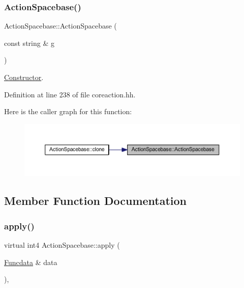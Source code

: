 \subsubsection{\texorpdfstring{ActionSpacebase()}{ActionSpacebase()}}
{\footnotesize\ttfamily Action\+Spacebase\+::\+Action\+Spacebase (\begin{DoxyParamCaption}\item[{const string \&}]{g }\end{DoxyParamCaption})\hspace{0.3cm}{\ttfamily [inline]}}



\mbox{\hyperlink{class_constructor}{Constructor}}. 



Definition at line 238 of file coreaction.\+hh.

Here is the caller graph for this function\+:
\nopagebreak
\begin{figure}[H]
\begin{center}
\leavevmode
\includegraphics[width=350pt]{class_action_spacebase_ae18b727e01f1f2c72c6e53f16dd8864d_icgraph}
\end{center}
\end{figure}


\subsection{Member Function Documentation}
\mbox{\label{class_action_spacebase_ace4b23e248568955820212813c911719}} 
\subsubsection{\texorpdfstring{apply()}{apply()}}
{\footnotesize\ttfamily virtual int4 Action\+Spacebase\+::apply (\begin{DoxyParamCaption}\item[{\mbox{\hyperlink{class_funcdata}{Funcdata}} \&}]{data }\end{DoxyParamCaption})\hspace{0.3cm}{\ttfamily [inline]}, {\ttfamily [virtual]}}



